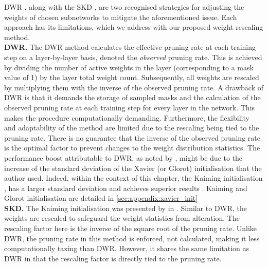\ac{DWR} \cite{DBLP:conf/nips/ZhouLLY19}, along with the \ac{SKD}
\cite{DBLP:conf/cvpr/RamanujanWKFR20}, are two recognised strategies for
adjusting the weights of chosen subnetworks to mitigate the aforementioned
issue. Each approach has its limitations, which we address with our proposed
weight rescaling method.\\

\noindent\textbf{ \acl{DWR}.} The \ac{DWR} \cite{DBLP:conf/nips/ZhouLLY19}
method calculates the effective pruning rate at each training step on a
layer-by-layer basis, denoted the \emph{observed} pruning rate. This is achieved
by dividing the number of active weights in the layer (corresponding to a mask
value of 1) by the layer total weight count. Subsequently, all weights are
rescaled by multiplying them with the inverse of the observed pruning rate. A
drawback of \ac{DWR} is that it demands the storage of sampled masks and the
calculation of the observed pruning rate at each training step for every layer
in the network. This makes the procedure computationally demanding. Furthermore,
the flexibility and adaptability of the method are limited due to the rescaling
being tied to the pruning rate. There is no guarantee that the inverse of the
observed pruning rate is the optimal factor to prevent changes to the weight
distribution statistics. The performance boost attributable to \ac{DWR}, as
noted by \citeauthor{DBLP:conf/nips/ZhouLLY19}, might be due to the increase of
the standard deviation of the Xavier (or Glorot) initialisation
\cite{glorot2011deep} that the author used. Indeed, within the context of this
chapter, the Kaiming initialisation \cite{DBLP:conf/cvpr/HeZRS16}, has a larger
standard deviation and achieves superior results
\cite{DBLP:conf/cvpr/RamanujanWKFR20,DBLP:journals/corr/abs-2202-12002}. Kaiming
and Glorot initialisation are detailed in \cref{sec:appendix:xavier_init}\\

\noindent\textbf{\acl{SKD}.} The Kaiming initialisation
\cite{DBLP:conf/cvpr/HeZRS16} was presented by
\citeauthor{DBLP:conf/cvpr/RamanujanWKFR20} in
\cite{DBLP:conf/cvpr/RamanujanWKFR20}. Similar to \ac{DWR}, the weights are
rescaled to safeguard the weight statistics from alteration. The rescaling
factor here is the inverse of the square root of the pruning rate. Unlike
\ac{DWR}, the pruning rate in this method is enforced, not calculated, making it
less computationally taxing than \ac{DWR}. However, it shares the same
limitation as \ac{DWR} in that the rescaling factor is directly tied to the
pruning rate.\\

